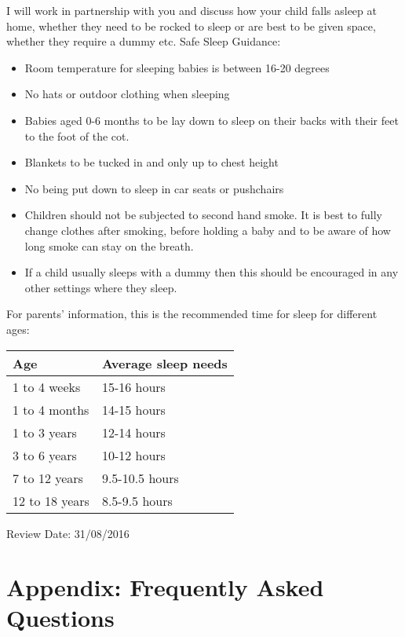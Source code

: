 I will work in partnership with you and discuss how your child falls asleep at home, whether they need to be rocked to sleep or are best to be given space, whether they require a dummy etc. 
Safe Sleep Guidance:

\begin{itemize}
\item Room temperature for sleeping babies is between 16-20 degrees
\item No hats or outdoor clothing when sleeping
\item Babies aged 0-6 months to be lay down to sleep on their backs with their feet to the foot of the cot.
\item Blankets to be tucked in and only up to chest height
\item No being put down to sleep in car seats or pushchairs
\item Children should not be subjected to second hand smoke. It is best to fully change clothes after smoking, before holding a baby and to be aware of how long smoke can stay on the breath. 
\item If a child usually sleeps with a dummy then this should be encouraged in any other settings where they sleep. 
\end{itemize}

For parents' information, this is the recommended time for sleep for different ages:

\begin{table}[h]
  \begin{tabular}{|l|l|}
    \hline
    Age & Average sleep needs \\
    \hline
    1 to 4 weeks     &   15-16 hours \\
    \hline       
    1 to 4 months &   14-15 hours \\
    \hline
    1 to 3 years &   12-14 hours \\
    \hline
    3 to 6 years &   10-12 hours \\
    \hline
    7 to 12 years &   9.5-10.5 hours \\
    \hline
    12 to 18 years &   8.5-9.5 hours \\
    \hline
  \end{tabular}
\end{table}

Review Date: 31/08/2016

\clearpage

\appendix
\section{Appendix: Frequently Asked Questions}

